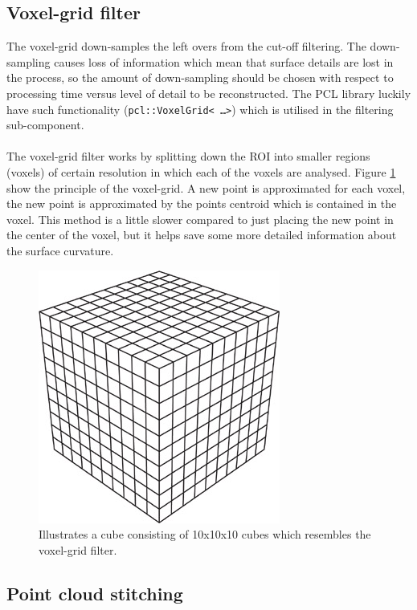 \subsection{Voxel-grid filter}
The voxel-grid down-samples the left overs from the cut-off filtering. The down-sampling causes loss of information which mean that surface details are lost in the process, so the amount of down-sampling should be chosen with respect to processing time versus level of detail to be reconstructed. The PCL library luckily have such functionality (\texttt{pcl::VoxelGrid< \ldots >}) which is utilised in the filtering sub-component.\\
\\
The voxel-grid filter works by splitting down the ROI into smaller regions (voxels) of certain resolution in which each of the voxels are analysed. Figure \ref{fig:filtering_voxel_grid} show the principle of the voxel-grid. A new point is approximated for each voxel, the new point is approximated by the points centroid which is contained in the voxel. This method is a little slower compared to just placing the new point in the center of the voxel, but it helps save some more detailed information about the surface curvature.
\begin{figure}[htb]
	\begin{center}
		\includegraphics[scale=0.7,trim=0 0 0 0]{graphics/07_modelling/cube.jpg}%
		\caption{Illustrates a cube consisting of 10x10x10 cubes which resembles the voxel-grid filter.}
		\label{fig:filtering_voxel_grid}
	\end{center}
\end{figure}

\subsection{Point cloud stitching}